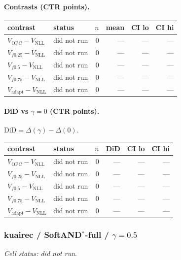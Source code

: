 \documentclass[10pt,a4paper]{article}
\begin{document}
\paragraph{Contrasts (CTR points).}
{\centering\small\begin{tabular}{llrrrr}
\toprule contrast & status & $n$ & mean & CI lo & CI hi \\
\midrule
$V_{\mathrm{OPC}}-V_{\mathrm{NLL}}$ & did not run & 0 & --- & --- & --- \\
$V_{f0.25}-V_{\mathrm{NLL}}$ & did not run & 0 & --- & --- & --- \\
$V_{f0.5}-V_{\mathrm{NLL}}$ & did not run & 0 & --- & --- & --- \\
$V_{f0.75}-V_{\mathrm{NLL}}$ & did not run & 0 & --- & --- & --- \\
$V_{\mathrm{adapt}}-V_{\mathrm{NLL}}$ & did not run & 0 & --- & --- & --- \\
\bottomrule\end{tabular}\par}
\paragraph{DiD vs $\gamma=0$ (CTR points).} $\mathrm{DiD}=\Delta(\gamma)-\Delta(0)$.
{\centering\small\begin{tabular}{llrrrr}
\toprule contrast & status & $n$ & DiD & CI lo & CI hi \\
\midrule
$V_{\mathrm{OPC}}-V_{\mathrm{NLL}}$ & did not run & 0 & --- & --- & --- \\
$V_{f0.25}-V_{\mathrm{NLL}}$ & did not run & 0 & --- & --- & --- \\
$V_{f0.5}-V_{\mathrm{NLL}}$ & did not run & 0 & --- & --- & --- \\
$V_{f0.75}-V_{\mathrm{NLL}}$ & did not run & 0 & --- & --- & --- \\
$V_{\mathrm{adapt}}-V_{\mathrm{NLL}}$ & did not run & 0 & --- & --- & --- \\
\bottomrule\end{tabular}\par}
\bigskip
\subsubsection{kuairec / SoftAND$^*$-full / $\gamma=0.5$}
\emph{Cell status: did not run}.
\end{document}
